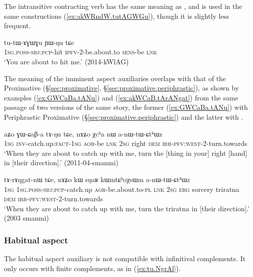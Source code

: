 The intransitive contracting verb  has the same meaning as , and is used in the same constructions (\ref{ex:akWRndW.tutAGWGu}), though it is slightly less frequent.

\begin{exe}
\ex \label{ex:akWRndW.tutAGWGu}
 \gll [a-kɯ-ʁndɯ] tu-tɯ-ɤɣɯɣu ɲɯ-ŋu tɕe \\
\textsc{1sg}.\textsc{poss}-\textsc{sbj}:\textsc{pcp}-hit \textsc{ipfv}-2-be.about.to \textsc{sens}-be \textsc{lnk} \\
\glt `You are about to hit me.' (2014-kWlAG)
\end{exe}

The meaning of the imminent aspect auxiliaries overlaps with that of the Proximative (§\ref{sec:proximative}, §\ref{sec:proximative.periphrastic}), as shown by examples (\ref{ex:GWCaBa.tANu}) and (\ref{ex:akWCaB.tArANgat}) from the same passage of two versions of the same story, the former (\ref{ex:GWCaBa.tANu}) with Periphrastic Proximative (§\ref{sec:proximative.periphrastic}) and the latter with .


\begin{exe}
\ex \label{ex:GWCaBa.tANu}
 \gll aʑo ɣɯ-ɕaβ-a tɤ-ŋu tɕe, nɤʑo χcʰa nɯ a-nɯ-tɯ-ɕtʰɯz \\
 \textsc{1sg} \textsc{inv}-catch.up:\textsc{fact}-\textsc{1sg} \textsc{aor}-be \textsc{lnk} \textsc{2sg} right \textsc{dem} \textsc{irr}-\textsc{pfv}:\textsc{west}-2-turn.towards \\
 \glt `When they are about to catch up with me, turn the [thing in your] right [hand] in [their direction].' (2011-04-smanmi)
\end{exe}

\begin{exe}
\ex \label{ex:akWCaB.tArANgat}
  tɤ-rɤŋgat-nɯ tɕe, nɤʑo kɯ sŋaʁ kɯmtɕʰoχsɯm a-nɯ-tɯ-ɕtʰɯz \\
 \textsc{1sg} \textsc{1sg}.\textsc{poss}-\textsc{sbj}:\textsc{pcp}-catch.up \textsc{aor}-be.about.to-\textsc{pl} \textsc{lnk}  \textsc{2sg} \textsc{erg} sorcery triratna \textsc{dem} \textsc{irr}-\textsc{pfv}:\textsc{west}-2-turn.towards \\
 \glt `When they are about to catch up with me, turn the triratna in [their direction].' (2003 smanmi)
\end{exe}



\subsubsection{Habitual aspect} \label{sec:NgrAl}
The habitual aspect auxiliary  is not compatible with infinitival complements. It only occurs with finite complements, as in (\ref{ex:tu.NgrAl}).

